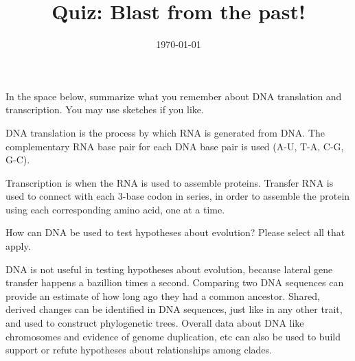 \documentclass[quiz,addpoints,noanswers]{exam}
\title{Quiz: Blast from the past!}
\date{\today}
\author{\mobeardInstructorShort}
\begin{document}
\maketitle

\begin{questions}
\question[4] In the space below, summarize what you remember about DNA translation and transcription. You may use sketches if you like. 
\begin{solution}[4in]
DNA translation is the process by which RNA is generated from DNA. The complementary RNA base pair for each DNA base pair is used (A-U, T-A, C-G, G-C).

Transcription is when the RNA is used to assemble proteins. Transfer RNA is used to connect with each 3-base codon in series, in order to assemble the protein using each corresponding amino acid, one at a time. 
\end{solution}

\question[1] How can DNA be used to test hypotheses about evolution? Please select all that apply. 
\begin{choices}
\choice DNA is not useful in testing hypotheses about evolution, because lateral gene transfer happens a bazillion times a second. 
\CorrectChoice Comparing two DNA sequences can provide an estimate of how long ago they had a common ancestor.
\CorrectChoice Shared, derived changes can be identified in DNA sequences, just like in any other trait, and used to construct phylogenetic trees. 
\CorrectChoice Overall data about DNA like chromosomes and evidence of genome duplication, etc can also be used to build support or refute hypotheses about relationships among clades. 
\end{choices}

\end{questions}
\end{document}
